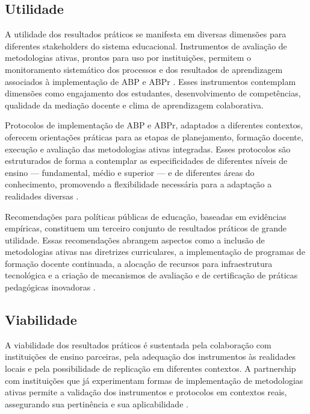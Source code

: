 \subsection{Utilidade}
\label{subsec:jpr_utilidade}

A utilidade dos resultados práticos se manifesta em diversas dimensões para diferentes stakeholders do sistema educacional. Instrumentos de avaliação de metodologias ativas, prontos para uso por instituições, permitem o monitoramento sistemático dos processos e dos resultados de aprendizagem associados à implementação de ABP e ABPr \cite{BLACK1998}. Esses instrumentos contemplam dimensões como engajamento dos estudantes, desenvolvimento de competências, qualidade da mediação docente e clima de aprendizagem colaborativa.

Protocolos de implementação de ABP e ABPr, adaptados a diferentes contextos, oferecem orientações práticas para as etapas de planejamento, formação docente, execução e avaliação das metodologias ativas integradas. Esses protocolos são estruturados de forma a contemplar as especificidades de diferentes níveis de ensino — fundamental, médio e superior — e de diferentes áreas do conhecimento, promovendo a flexibilidade necessária para a adaptação a realidades diversas \cite{SANTOS2019}.

Recomendações para políticas públicas de educação, baseadas em evidências empíricas, constituem um terceiro conjunto de resultados práticos de grande utilidade. Essas recomendações abrangem aspectos como a inclusão de metodologias ativas nas diretrizes curriculares, a implementação de programas de formação docente continuada, a alocação de recursos para infraestrutura tecnológica e a criação de mecanismos de avaliação e de certificação de práticas pedagógicas inovadoras \cite{MACHADO2025}.

\subsection{Viabilidade}
\label{subsec:jpr_viabilidade}

A viabilidade dos resultados práticos é sustentada pela colaboração com instituições de ensino parceiras, pela adequação dos instrumentos às realidades locais e pela possibilidade de replicação em diferentes contextos. A partnership com instituições que já experimentam formas de implementação de metodologias ativas permite a validação dos instrumentos e protocolos em contextos reais, assegurando sua pertinência e sua aplicabilidade \cite{MACIEL2018}.

